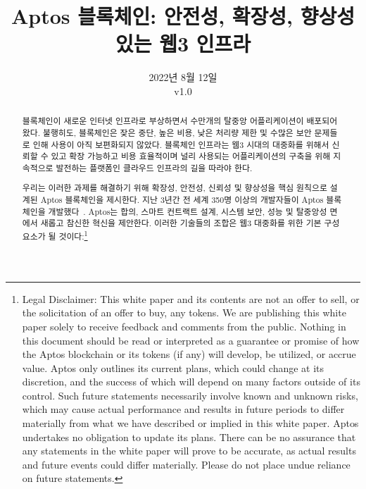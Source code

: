 \documentclass{article}
\title{Aptos 블록체인: 안전성, 확장성, 향상성 있는 웹3 인프라}
\author{}
\date{2022년 8월 12일\\v1.0}
\begin{document}
\maketitle

\renewcommand{\abstractname}{초록}
\renewcommand{\figurename}{그림}

\begin{abstract}
블록체인이 새로운 인터넷 인프라로 부상하면서 수만개의 탈중앙 어플리케이션이 배포되어 왔다. 불행히도, 블록체인은 잦은 중단, 높은 비용, 낮은 처리량 제한 및 수많은 보안 문제들로 인해 사용이 아직 보편화되지 않았다. 블록체인 인프라는 웹3 시대의 대중화를 위해서 신뢰할 수 있고 확장 가능하고 비용 효율적이며 널리 사용되는 어플리케이션의 구축을 위해 지속적으로 발전하는 플랫폼인 클라우드 인프라의 길을 따라야 한다.

우리는 이러한 과제를 해결하기 위해 확장성, 안전성, 신뢰성 및 향상성을 핵심 원칙으로 설계된  Aptos 블록체인을 제시한다. 지난 3년간 전 세계 350명 이상의 개발자들이 Aptos 블록체인을 개발했다~\cite{aptos_core_github}. Aptos는 합의, 스마트 컨트랙트 설계, 시스템 보안, 성능 및 탈중앙성 면에서 새롭고 참신한 혁신을 제안한다. 이러한 기술들의 조합은 웹3 대중화를 위한 기본 구성 요소가 될 것이다:\footnote{Legal Disclaimer: This white paper and its contents are not an offer to sell, or the solicitation of an offer to buy, any tokens. We are publishing this white paper solely to receive feedback and comments from the public. Nothing in this document should be read or interpreted as a guarantee or promise of how the Aptos blockchain or its tokens (if any) will develop, be utilized, or accrue value. Aptos only outlines its current plans, which could change at its discretion, and the success of which will depend on many factors outside of its control. Such future statements necessarily involve known and unknown risks, which may cause actual performance and results in future periods to differ materially from what we have described or implied in this white paper. Aptos undertakes no obligation to update its plans. There can be no assurance that any statements in the white paper will prove to be accurate, as actual results and future events could differ materially. Please do not place undue reliance on future statements.}
 

\end{abstract}
\end{document}
